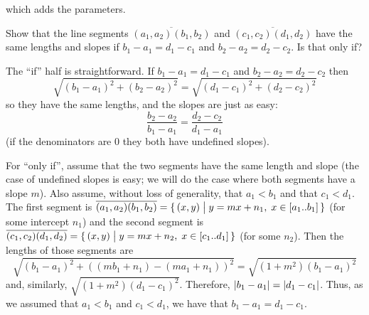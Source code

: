 \begin{exercises}
\begin{answer}
\begin{exparts}
          which adds the parameters.
      \end{exparts}
    \end{answer}
  \item 
    Show that the line segments
    \( \overline{(a_1,a_2)(b_1,b_2)} \) and
    \( \overline{(c_1,c_2)(d_1,d_2)} \)
    have the same lengths and slopes if
    \(  b_1-a_1=d_1-c_1 \) and \( b_2-a_2=d_2-c_2 \).
    Is that only if?
    \begin{answer}
      The ``if'' half is straightforward.
      If \( b_1-a_1=d_1-c_1 \) and \( b_2-a_2=d_2-c_2 \) then
      \begin{equation*}
        \sqrt{(b_1-a_1)^2+(b_2-a_2)^2}
        =\sqrt{(d_1-c_1)^2+(d_2-c_2)^2}
      \end{equation*}
      so they have the same lengths, and the slopes are just as easy:
      \begin{equation*}
        \frac{b_2-a_2}{b_1-a_1}
        =\frac{d_2-c_2}{d_1-a_1}
      \end{equation*}
      (if the denominators are \( 0 \) they both have undefined slopes).

     For ``only if'', assume that
     the two segments have the same length and slope
     (the case of undefined slopes is easy; we will do the case where both
     segments have a slope \( m \)).
     Also assume, without loss of generality, that $a_1<b_1$ and that
     $c_1<d_1$.
     The first segment is
     \( \overline{(a_1,a_2)(b_1,b_2)}=
     \mbox{$\{\,(x,y)\bigm| y=mx+n_1,\; x\in [a_1..b_1]\,\}$} \)
     (for some intercept $n_1$)
     and the second segment is \( \overline{(c_1,c_2)(d_1,d_2)}=
     \mbox{$\{\,(x,y)\bigm| y=mx+n_2,\; x\in [c_1..d_1]\,\}$} \)
     (for some $n_2$).
     Then the lengths of those segments are
     \begin{equation*}
     \sqrt{(b_1-a_1)^2+((mb_1+n_1)-(ma_1+n_1))^2}
       =\sqrt{(1+m^2)(b_1-a_1)^2}
     \end{equation*}
     and, similarly, \( \sqrt{(1+m^2)(d_1-c_1)^2} \).
     Therefore, \( |b_1-a_1|=|d_1-c_1| \).
     Thus, as we assumed that \( a_1<b_1 \) and \( c_1<d_1 \), we have
     that \( b_1-a_1=d_1-c_1 \).


\end{answer}
\end{exercises}
